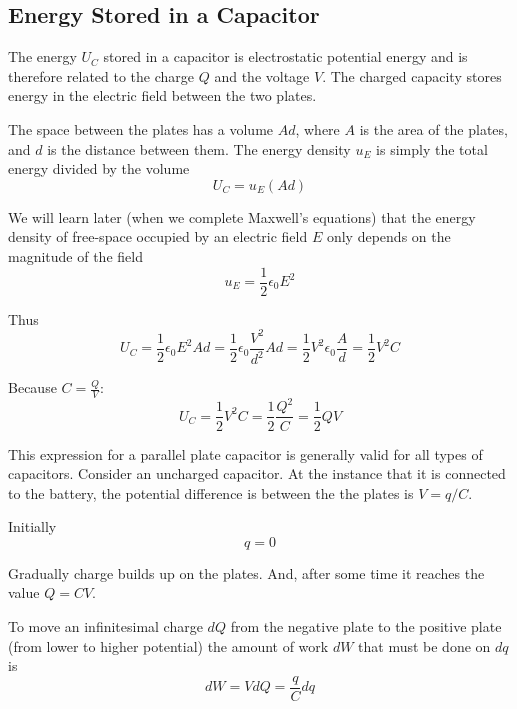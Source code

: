 \documentclass[14pt]{memoir}
\begin{document}
\subsection{Energy Stored in a Capacitor}

The energy $U_{C}$ stored in a capacitor is electrostatic potential energy and is therefore related to the charge $Q$ and the voltage $V$. The charged capacity stores energy in the electric field between the two plates. 

The space between the plates has a volume $Ad$, where $A$ is the area of the plates, and $d$ is the distance between them. The energy density $u_E$ is simply the total energy divided by the volume
\begin{equation}
U_C = u_E (Ad)
\end{equation}

We will learn later (when we complete Maxwell's equations) that the energy density of free-space occupied by an electric field $E$ only depends on the magnitude of the field
\begin{equation}
u_E = \frac{1}{2} \epsilon_0 E^2
\end{equation}

Thus
\begin{equation}
U_C = \frac{1}{2} \epsilon_0 E^2 Ad = \frac{1}{2} \epsilon_0 \frac{V^2}{d^2} Ad = \frac{1}{2} V^2 \epsilon_0 \frac{A}{d} = \frac{1}{2} V^2 C
\end{equation}

Because $C = \frac{Q}{V}$:
\begin{equation}
U_C =  \frac{1}{2} V^2 C = \frac{1}{2} \frac{Q^2}{C} = \frac{1}{2}QV
\label{eq:uc}
\end{equation}

This expression for a parallel plate capacitor is generally valid for all types of capacitors. Consider an uncharged capacitor. At the instance that it is connected to the battery, the potential difference is between the the plates is $V = q/C$.

Initially
\begin{equation}
q = 0
\end{equation}

Gradually charge builds up on the plates. And, after some time it reaches the value $Q = CV$. 

To move an infinitesimal charge $dQ$ from the negative plate to the positive plate (from lower to higher potential) the amount of work $dW$ that must be done on $dq$ is
\begin{equation}
dW = VdQ = \frac{q}{C}dq
\end{equation}
\end{document}
